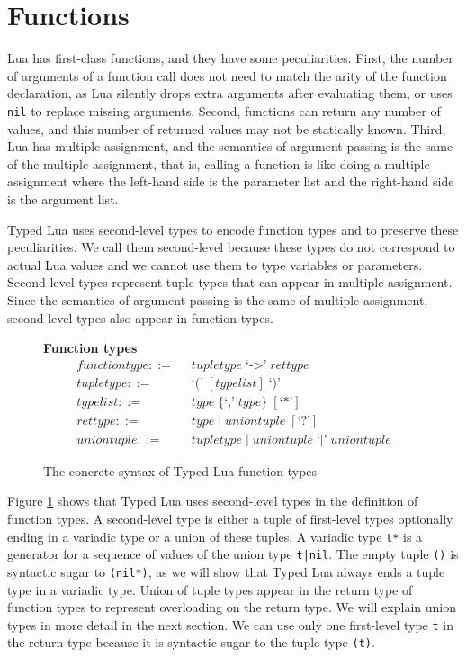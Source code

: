 \section{Functions}
\label{sec:functions}

Lua has first-class functions, and they have some peculiarities.
First, the number of arguments of a function call does
not need to match the arity of the function declaration, as Lua silently
drops extra arguments after evaluating them, or uses \texttt{nil} to
replace missing arguments.
Second, functions can return any number of values,
and this number of returned values may not be statically known.
Third, Lua has multiple assignment, and the semantics
of argument passing is the same of the multiple assignment, that is,
calling a function is like doing a multiple assignment where the
left-hand side is the parameter list and the right-hand side is the
argument list.

Typed Lua uses second-level types to encode function types
and to preserve these peculiarities.
We call them second-level because these types do not correspond
to actual Lua values and we cannot use them to type variables or
parameters.
Second-level types represent tuple types that can appear in multiple assignment.
Since the semantics of argument passing is the same of multiple assignment,
second-level types also appear in function types.

\begin{figure}[!ht]
\textbf{Function types}\\
\dstart
\begin{align*}
\textit{functiontype} ::= & \;\; \textit{tupletype} \; \texttt{`->'} \; \textit{rettype}\\
\textit{tupletype} ::= & \;\; \texttt{`('} \; [typelist] \; \texttt{`)'}\\
\textit{typelist} ::= & \;\; \textit{type} \; \{\texttt{`,'} \; \textit{type}\} \; [\texttt{`*'}]\\
\textit{rettype} ::= & \;\; \textit{type} \; | \;
  \textit{uniontuple} \; [\texttt{`?'}]\\
\textit{uniontuple} ::= & \;\; \textit{tupletype} \; | \;
  \textit{uniontuple} \; \texttt{`|'} \; \textit{uniontuple}
\end{align*}
\dend
\caption{The concrete syntax of Typed Lua function types}
\label{fig:functions}
\end{figure}

Figure \ref{fig:functions} shows that Typed Lua uses second-level
types in the definition of function types.
A second-level type is either a tuple of first-level types optionally
ending in a variadic type or a union of these tuples.
A variadic type \texttt{t*} is a generator for a sequence of values
of the union type \texttt{t|nil}.
The empty tuple \texttt{()} is syntactic sugar to \texttt{(nil*)},
as we will show that Typed Lua always ends a tuple type in a variadic type.
Union of tuple types appear in the return type of function types to
represent overloading on the return type.
We will explain union types in more detail in the next section.
We can use only one first-level type \texttt{t} in the return type
because it is syntactic sugar to the tuple type \texttt{(t)}.

